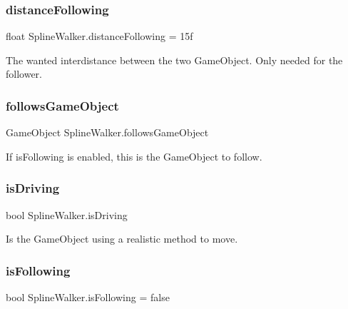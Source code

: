 \subsubsection{\texorpdfstring{distance\+Following}{distanceFollowing}}
{\footnotesize\ttfamily float Spline\+Walker.\+distance\+Following = 15f}



The wanted interdistance between the two Game\+Object. Only needed for the follower.

\mbox{\label{classSplineWalker_a98a7d49f715f41e9a7b5bfe779f11d75}} 
\subsubsection{\texorpdfstring{follows\+Game\+Object}{followsGameObject}}
{\footnotesize\ttfamily Game\+Object Spline\+Walker.\+follows\+Game\+Object}



If is\+Following is enabled, this is the Game\+Object to follow.

\mbox{\label{classSplineWalker_a21421e86b8ad0d38e04eadb1fcb0d57c}} 
\subsubsection{\texorpdfstring{is\+Driving}{isDriving}}
{\footnotesize\ttfamily bool Spline\+Walker.\+is\+Driving}



Is the Game\+Object using a realistic method to move.

\mbox{\label{classSplineWalker_a7362491b40105af4e4f55c325257d7f7}} 
\subsubsection{\texorpdfstring{is\+Following}{isFollowing}}
{\footnotesize\ttfamily bool Spline\+Walker.\+is\+Following = false}




